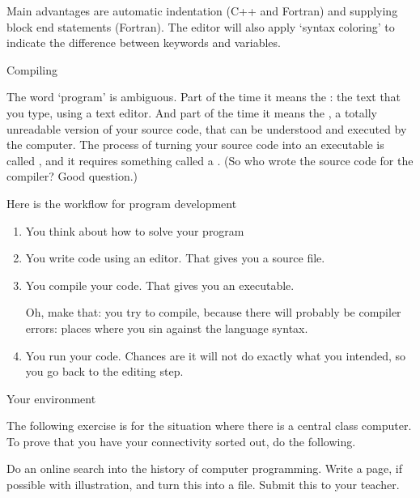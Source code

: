 Main advantages are automatic indentation (C++ and Fortran) and
supplying block end statements (Fortran). The editor will also apply
`syntax coloring' to indicate the difference between keywords and variables.

 {Compiling}

The word `program' is ambiguous. Part of the time it means the
: the text that you type, using a text
editor. And part of the time it means the , a
totally unreadable version of your source code, that can be understood and
executed by the computer. The process of turning your source code into
an executable is called , and it requires
something called a . (So who wrote the source code
for the compiler? Good question.)

Here is the workflow for program development
\begin{enumerate}
\item You think about how to solve your program
\item You write code using an editor. That gives you a source file.
\item You compile your code. That gives you an executable.

  Oh, make that: you try to compile,
  because there will probably be compiler errors: places where you
  sin against the language syntax.
\item You run your code. Chances are it will not do exactly what you
  intended, so you go back to the editing step.
\end{enumerate}

 {Your environment}

The following exercise is for the situation where there is a
central class computer.
To prove that you have your connectivity sorted out, do the following.

\begin{exercise}
  \label{ex:ssh-scp}
  Do an online search into the history of computer programming.
  Write a page, if possible with illustration, and turn this into a
   file. Submit this to your teacher.
\end{exercise}
